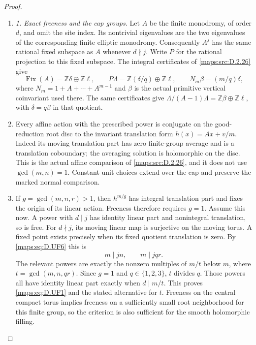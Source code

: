\begin{proof}
\begin{enumerate}[label=\arabic*.,leftmargin=*]
\item \emph{1. Exact freeness and the cap groups.}
Let $A$ be the finite monodromy, of order $d$, and omit the
site index. Its nontrivial eigenvalues are the two eigenvalues
of the corresponding finite elliptic monodromy. Consequently
$A^j$ has the same rational fixed subspace as $A$ whenever
$d\nmid j$. Write $P$ for the rational projection to this fixed
subspace. The integral certificates of \ref{maps:src:D.2.26} give
\[
 \operatorname{Fix}(A)=\mathbb Z\delta\oplus\mathbb Z\ell,
 \qquad P\Lambda=\mathbb Z(\delta/q)\oplus\mathbb Z\ell,
 \qquad N_m\beta=(m/q)\delta,                               \tag{D.UF6}\label{maps:eq:D.UF6}
\]
where $N_m=1+A+\cdots+A^{m-1}$ and $\beta$ is the actual
primitive vertical coinvariant used there. The same certificates
give
$\Lambda/(A-1)\Lambda=\mathbb Z\beta\oplus\mathbb Z\ell$,
with $\delta=q\beta$ in that quotient.

\item Every affine action with the prescribed power is conjugate
on the good-reduction root disc to the invariant translation
form $h(x)=Ax+v/m$. Indeed its moving translation part has
zero finite-group average and is a translation coboundary;
the averaging solution is holomorphic on the disc. This is
the actual affine comparison of \ref{maps:src:D.2.26}, and it does not use
$\gcd(m,n)=1$. Constant unit choices extend over the cap and
preserve the marked normal comparison.

\item If $g=\gcd(m,n,r)>1$, then $h^{m/g}$ has integral translation
part and fixes the origin of its linear action. Freeness
therefore requires $g=1$. Assume this now. A power with
$d\mid j$ has identity linear part and nonintegral translation,
so is free. For $d\nmid j$, its moving linear map is surjective
on the moving torus. A fixed point exists precisely when its
fixed quotient translation is zero. By \eqref{maps:eq:D.UF6} this is
\[
 m\mid jn,\qquad m\mid jqr.
\]
The relevant powers are exactly the nonzero multiples of
$m/t$ below $m$, where $t=\gcd(m,n,qr)$. Since $g=1$ and
$q\in\{1,2,3\}$, $t$ divides $q$. Those powers all have
identity linear part exactly when $d\mid m/t$. This proves
\eqref{maps:eq:D.UF1} and the stated alternative for $t$. Freeness on the
central compact torus implies freeness on a sufficiently small
root neighborhood for this finite group, so the criterion is
also sufficient for the smooth holomorphic filling.


\end{enumerate}
\end{proof}
